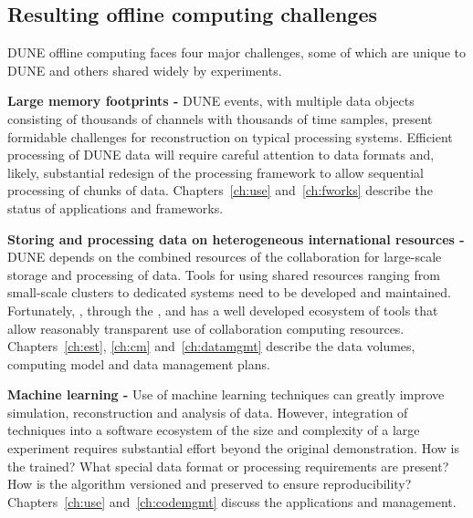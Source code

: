 \documentclass[../main-v1.tex]{subfiles}
\begin{document}
\subsection{Resulting offline computing challenges} \label{intro:challenges}

DUNE offline computing faces four major challenges, some of which are unique to DUNE and others shared widely by  experiments.  

\begin{description}
\item{\bf Large memory footprints -}  DUNE events, with multiple data objects consisting of  thousands of channels with thousands of time samples,   present formidable challenges for reconstruction on typical  processing systems. Efficient processing of DUNE data will require careful attention to data formats and, likely, substantial redesign of the processing framework to allow sequential processing of chunks of data.  Chapters~\ref{ch:use} and~\ref{ch:fworks} describe the status of applications and frameworks. 

\item{\bf Storing and processing data on heterogeneous international  resources -} DUNE depends on the combined resources of the collaboration for large-scale storage and processing of data.   Tools for using shared resources ranging from small-scale clusters to dedicated  systems need to be developed and maintained.   Fortunately, , through the ,  and   has a well developed ecosystem of tools that allow reasonably transparent use of collaboration computing resources.  Chapters~\ref{ch:est}, \ref{ch:cm} and~\ref{ch:datamgmt} describe the data volumes, computing model and data management plans. 

\item{
\bf Machine learning - }  Use of machine learning techniques can greatly improve simulation, reconstruction and analysis of data. However, integration of  techniques into a software ecosystem of the size and complexity of a large  experiment requires substantial effort beyond the original demonstration.  How is the  trained?  What special data format or processing requirements are present? How is the algorithm versioned and preserved to ensure reproducibility?   Chapters~\ref{ch:use} and~\ref{ch:codemgmt} discuss the applications and management.


\end{description}
\end{document}
